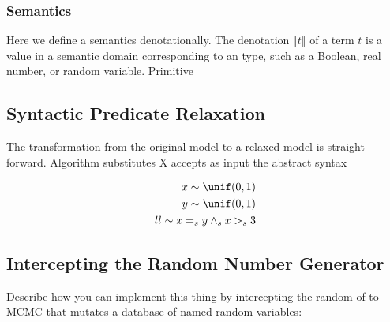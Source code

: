 \subsubsection{Semantics}\label{semantics}
\newcommand{\sem}[1]{\llbracket #1 \rrbracket}
Here we define a semantics denotationally.
The denotation $\sem{t}$ of a term $t$ is a value in a semantic domain corresponding to an \omegalang{} type, such as a Boolean, real number, or random variable.
Primitive 


\subsection{Syntactic Predicate Relaxation}

The transformation from the original model to a relaxed model is straight forward.
Algorithm substitutes X accepts as input the abstract syntax

\begin{align*}
	x \sim \unif(0, 1)              \\
	y \sim \unif(0, 1)              \\
	ll \sim x =_s y \land_s x >_s 3 \\
\end{align*}

\subsection{Intercepting the Random Number Generator}\label{rng}

Describe how you can implement this thing by intercepting the random 
of \citep{wingate2011lightweight, milch20071} to MCMC that mutates a database of named random variables:
